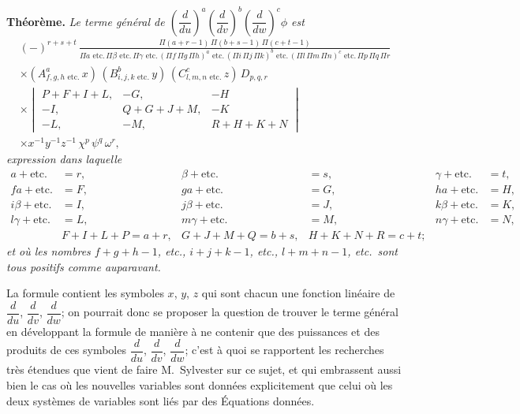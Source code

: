 \documentclass[11pt,a4paper]{book}
\theoremstyle{plain}
\begin{document}
\textbf{Th\'{e}or\`{e}me.} \textit{Le terme g\'{e}n\'{e}ral de $\left(\dfrac{d}{du}\right)^a\left(\dfrac{d}{dv}\right)^b\left(\dfrac{d}{dw}\right)^c\phi$ est}
\begin{multline*}
(-)^{r+s+t}\,\frac{\Pi(a+r-1)\,\Pi(b+s-1)\,\Pi(c+t-1)}{\Pi a\text{ etc.}\,\Pi\beta\text{ etc.}\,\Pi\gamma\text{ etc.}\,(\Pi f\,\Pi g\,\Pi h)^a\text{ etc.}\,(\Pi i\,\Pi j\,\Pi k)^b\text{ etc.}\,(\Pi l\,\Pi m\,\Pi n)^c\text{ etc.}\,\Pi p\,\Pi q\,\Pi r}\\
\times(A^a_{f,g,h\text{ etc.}}\,x)\,(B^b_{i,j,k\text{ etc.}}\,y)\,(C^c_{l,m,n\text{ etc.}}\,z)\,D_{p,q,r}\\
\times\begin{vmatrix}
P+F+I+L, & -G, & -H\\
-I, & Q+G+J+M, & -K\\
-L, & -M, & R+H+K+N
\end{vmatrix}\\
\times x^{-1}y^{-1}z^{-1}\,\chi^p\,\psi^q\,\omega^r,
\end{multline*}
\textit{expression dans laquelle}
\begin{align*}
a+\text{etc.}&=r, & \beta+\text{etc.}&=s, & \gamma+\text{etc.}&=t,\\
fa+\text{etc.}&=F, & ga+\text{etc.}&=G, & ha+\text{etc.}&=H,\\
i\beta+\text{etc.}&=I, & j\beta+\text{etc.}&=J, & k\beta+\text{etc.}&=K,\\
l\gamma+\text{etc.}&=L, & m\gamma+\text{etc.}&=M, & n\gamma+\text{etc.}&=N,\\
&F+I+L+P=a+r, & G+J+M+Q=b+s, & H+K+N+R=c+t;
\end{align*}
\textit{et o\`{u} les nombres $f+g+h-1$, etc., $i+j+k-1$, etc., $l+m+n-1$, etc.\ sont tous positifs comme auparavant.}

La formule contient les symboles $x$, $y$, $z$ qui sont chacun une fonction lin\'{e}aire de $\dfrac{d}{du}$, $\dfrac{d}{dv}$, $\dfrac{d}{dw}$; on pourrait donc se proposer la question de trouver le terme g\'{e}n\'{e}ral en d\'{e}veloppant la formule de mani\`{e}re \`{a} ne contenir que des puissances et des produits de ces symboles $\dfrac{d}{du}$, $\dfrac{d}{dv}$, $\dfrac{d}{dw}$; c'est \`{a} quoi se rapportent les recherches tr\`{e}s \'{e}tendues que vient de faire M.~Sylvester sur ce sujet, et qui embrassent aussi bien le cas o\`{u} les nouvelles variables sont donn\'{e}es explicitement que celui o\`{u} les deux syst\`{e}mes de variables sont li\'{e}s par des \'{E}quations donn\'{e}es.
\end{document}
